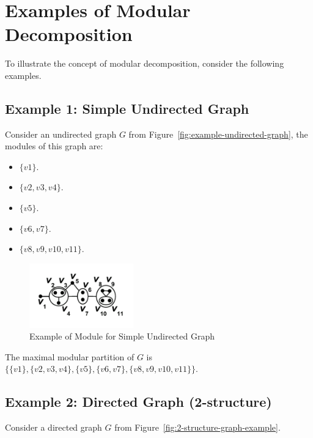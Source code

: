 \section{Examples of Modular Decomposition}\label{sec:examples-of-modular-decomposition}

To illustrate the concept of modular decomposition, consider the following examples.

\subsection*{Example 1: Simple Undirected Graph}\label{subsec:example-1:-simple-undirected-graph}

Consider an undirected graph $G$ from Figure~\ref{fig:example-undirected-graph}, the modules of this graph are:

\begin{itemize}
    \item $\{v1\}$.
    \item $\{v2, v3, v4\}$.
    \item $\{v5\}$.
    \item $\{v6, v7\}$.
    \item $\{v8, v9, v10, v11\}$.
\end{itemize}

\begin{figure}[!h]
    \centering
    \includegraphics[width=0.40\textwidth]{images/graphs/undirected_graph_wikipedia_module}
    \caption{Example of Module for Simple Undirected Graph}
    \label{fig:example-undirected-graph-module}
\end{figure}

The maximal modular partition of $G$ is $\{\{v1\}, \{v2, v3, v4\}, \{v5\}, \{v6, v7\}, \{v8, v9, v10, v11\}\}$.

\subsection*{Example 2: Directed Graph (2-structure)}\label{subsec:example-2:-directed-graph}

Consider a directed graph $G$ from Figure~\ref{fig:2-structure-graph-example}.

